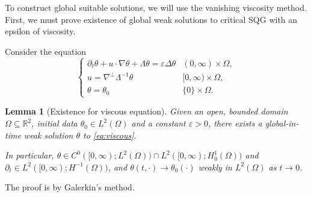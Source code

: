 \documentclass[11pt]{amsart}
\newtheorem{lemma}[theorem]{Lemma}
\theoremstyle{remark}
\theoremstyle{definition}
\newcommand{\R}{\mathbb{R}}
\newcommand{\eps}{\varepsilon}
\newcommand{\del}{\partial}
\newcommand{\grad}{\nabla}
\newcommand{\Laplace}{\Delta}
\newcommand{\n}{^{-1}}
\begin{document}
To construct global suitable solutions, we will use the vanishing viscosity method.  First, we must prove existence of global weak solutions to critical SQG with an epsilon of viscosity.  

Consider the equation
\begin{equation} \label{eq:viscous} \begin{cases}
\del_t \theta + u\cdot \grad \theta + \Lambda \theta = \eps \Laplace \theta & (0,\infty) \times \Omega,
\\ u = \grad^\perp \Lambda\n \theta & [0,\infty) \times \Omega,
\\ \theta = \theta_0 & \{0\} \times \Omega.
\end{cases} \end{equation}

\begin{lemma}[Existence for viscous equation] \label{thm:viscous}
Given an open, bounded domain $\Omega \subseteq \R^2$, initial data $\theta_0 \in L^2(\Omega)$ and a constant $\eps > 0$, there exists a global-in-time weak solution $\theta$ to \eqref{eq:viscous}.  

In particular, $\theta \in C^0([0,\infty);L^2(\Omega)) \cap L^2([0,\infty);H_0^1(\Omega))$ and $\del_t \in L^2([0,\infty);H^{-1}(\Omega))$, and $\theta(t,\cdot) \to \theta_0(\cdot)$ weakly in $L^2(\Omega)$ as $t \to 0$.  
\end{lemma}
The proof is by Galerkin's method.  
\end{document}
